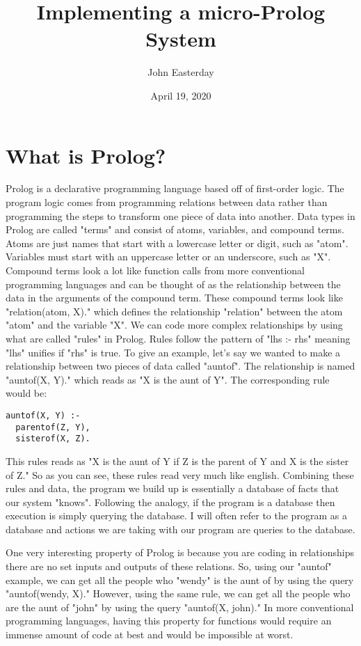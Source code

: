 \documentclass[a4paper, 12pt]{article}
\title{Implementing a micro-Prolog System}
\author{John Easterday}
\date{April 19, 2020}
\begin{document}
\maketitle

\section*{What is Prolog?}
Prolog is a declarative programming language based off of first-order logic.
The program logic comes from programming relations between data rather than programming the steps to transform one piece of data into another.
Data types in Prolog are called "terms" and consist of atoms, variables, and compound terms.
Atoms are just names that start with a lowercase letter or digit, such as "atom".
Variables must start with an uppercase letter or an underscore, such as "X".
Compound terms look a lot like function calls from more conventional programming languages and can be thought of as the relationship between the data in the arguments of the compound term.
These compound terms look like "relation(atom, X)." which defines the relationship "relation" between the atom "atom" and the variable "X".
We can code more complex relationships by using what are called "rules" in Prolog. 
Rules follow the pattern of "lhs :- rhs" meaning "lhs" unifies if "rhs" is true. 
To give an example, let's say we wanted to make a relationship between two pieces of data called "auntof".
The relationship is named "auntof(X, Y)." which reads as "X is the aunt of Y".
The corresponding rule would be:

\begin{verbatim}
auntof(X, Y) :-
  parentof(Z, Y),
  sisterof(X, Z).
\end{verbatim}

This rules reads as "X is the aunt of Y if Z is the parent of Y and X is the sister of Z." 
So as you can see, these rules read very much like english.
Combining these rules and data, the program we build up is essentially a database of facts that our system "knows".
Following the analogy, if the program is a database then execution is simply querying the database.
I will often refer to the program as a database and actions we are taking with our program are queries to the database.

One very interesting property of Prolog is because you are coding in relationships there are no set inputs and outputs of these relations.
So, using our "auntof" example, we can get all the people who "wendy" is the aunt of by using the query "auntof(wendy, X)."
However, using the same rule, we can get all the people who are the aunt of "john" by using the query "auntof(X, john)."
In more conventional programming languages, having this property for functions would require an immense amount of code at best and would be impossible at worst.
\end{document}

